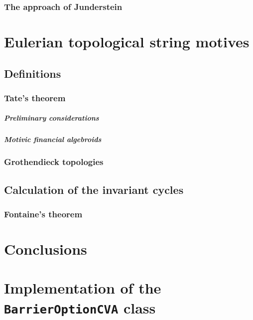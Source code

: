 \subsection{The approach of Junderstein}
\lipsum[23]
\cite{chambolle_pock_2011}

\chapter{Eulerian topological string motives}
\lipsum[23]
\section{Definitions}
\lipsum[23]
\subsection{Tate's theorem}
\paragraph{Preliminary considerations}
\lipsum[23]
\paragraph{Motivic financial algebroids}
\lipsum[23]

\subsection{Grothendieck topologies}
\lipsum[23]

\section{Calculation of the invariant cycles}
\lipsum[23]

\subsection{Fontaine's theorem}
\lipsum[23]

\chapter{Conclusions}
\lipsum[100]







\appendix
\chapter{Implementation of the {\tt BarrierOptionCVA} class}
\lipsum[100]

